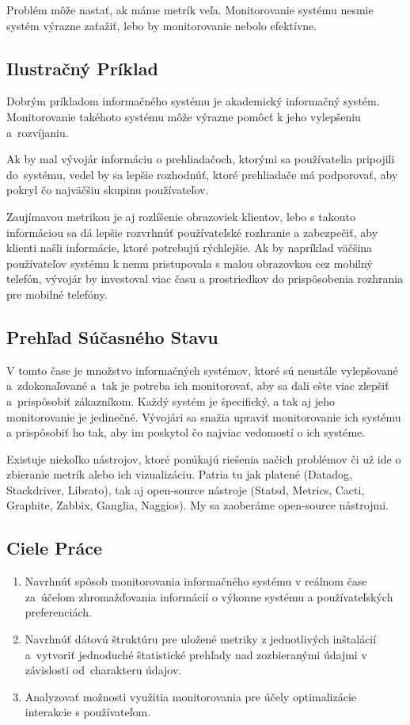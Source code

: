 \documentclass[a4paper, usesections, upjsfrontpage, disablespecwarning, thesismargins, thesislinespacing]{rnthesissvk}
\begin{document}
Problém môže nastať, ak máme metrík veľa.
Monitorovanie systému nesmie systém výrazne zaťažiť, lebo by monitorovanie nebolo efektívne.

\subsection{Ilustračný Príklad}

Dobrým príkladom informačného systému je akademický informačný systém.
Monitorovanie takéhoto systému môže výrazne pomôcť k jeho vylepšeniu a~rozví\-janiu.

Ak by mal vývojár informáciu o prehliadačoch, ktorými sa používatelia pripojili do~systému, vedel by sa lepšie rozhodnúť, ktoré prehliadače má podporovať, aby pokryl čo najväčšiu skupinu používateľov.

Zaujímavou metrikou je aj rozlíšenie obrazoviek klientov, lebo s takouto informáciou sa dá lepšie rozvrhnúť používateľské rozhranie a zabezpečiť, aby klienti našli informácie, ktoré potrebujú rýchlejšie.
Ak by napríklad väčšina používateľov systému k nemu pristupovala s malou obrazovkou cez mobilný telefón, vývojár by investoval viac času a prostriedkov do prispôsobenia rozhrania pre mobilné telefóny.


\subsection{Prehľad Súčasného Stavu}

V tomto čase je množstvo informačných systémov, ktoré sú neustále vylepšované a~zdokonaľované a~tak je potreba ich monitorovať, aby sa dali ešte viac zlepšiť a~prispôsobiť zákazníkom.
Každý systém je špecifický, a tak aj jeho monitorovanie je jedinečné.
Vývojári sa snažia upraviť monitorovanie ich systému a prispôsobiť ho tak, aby im poskytol čo najviac vedomostí o ich systéme.

Existuje niekoľko nástrojov, ktoré ponúkajú riešenia načich problémov či už ide o zbieranie metrík alebo ich vizualizáciu.
Patria tu jak platené (Datadog, Stackdriver, Librato), tak aj open-source nástroje (Statsd, Metrics, Cacti, Graphite, Zabbix, Ganglia, Naggios).
My sa zaoberáme open-source nástrojmi.

\subsection{Ciele Práce}

\begin{enumerate}
	\item Navrhnúť spôsob monitorovania informačného systému v reálnom čase za~úče\-lom zhromažďovania informácií o výkonne systému a používateľských pre\-ferenciách.
	\item Navrhnúť dátovú štruktúru pre uložené metriky z jednotlivých inštalácií a~vytvoriť jednoduché štatistické prehľady nad zozbieranými údajmi v závis\-losti od~charakteru údajov.
	\item Analyzovať možnosti využitia monitorovania pre účely optimalizácie interakcie s používateľom.
\end{enumerate}
\end{document}
